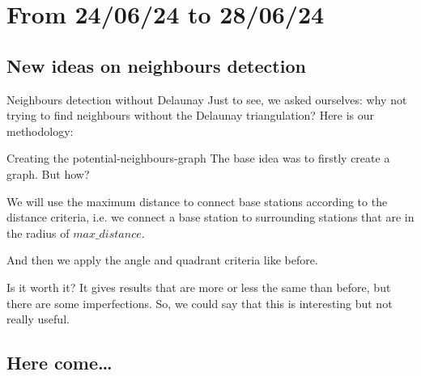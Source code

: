 \smallframetitle

\section{From 24/06/24 to 28/06/24}
\insertsectionframe

\subsection{New ideas on neighbours detection}
\insertsubsectionframe

\begin{frame}{Neighbours detection without Delaunay}
    Just to see, we asked ourselves: why not trying to find neighbours without the Delaunay triangulation? Here is our methodology:

    \begin{block}{Creating the potential-neighbours-graph}
        The base idea was to firstly create a graph. But how?

        We will use the maximum distance to connect base stations according to the distance criteria,
        i.e. we connect a base station to surrounding stations that are in the radius of $max\_distance$.
    \end{block}

    And then we apply the angle and quadrant criteria like before.
    
    \begin{block}{Is it worth it?}
        It gives results that are more or less the same than before, but there are some imperfections.
        So, we could say that this is interesting but not really useful.
    \end{block}
\end{frame}

\subsection{Here come\dots}
\insertsubsectionframe

